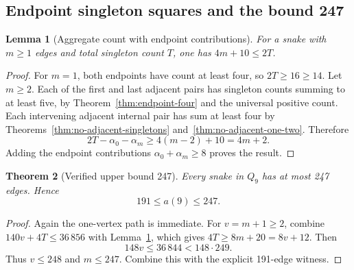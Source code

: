 \documentclass[11pt,a4paper]{article}
\newtheorem{theorem}{Theorem}[section]
\newtheorem{lemma}[theorem]{Lemma}
\theoremstyle{definition}
\theoremstyle{remark}
\newcommand{\Q}{Q}
\begin{document}
\subsection{Endpoint singleton squares and the bound 247}
\begin{lemma}[Aggregate count with endpoint contributions]\label{lem:aggregate-endpoints}
For a snake with $m\ge1$ edges and total singleton count $T$, one has $4m+10\le2T$.
\end{lemma}
\begin{proof}
For $m=1$, both endpoints have count at least four, so $2T\ge16\ge14$. Let $m\ge2$. Each of the first and last adjacent pairs has singleton counts summing to at least five, by Theorem~\ref{thm:endpoint-four} and the universal positive count. Each intervening adjacent internal pair has sum at least four by Theorems~\ref{thm:no-adjacent-singletons} and~\ref{thm:no-adjacent-one-two}. Therefore
\[
2T-\alpha_0-\alpha_m\ge4(m-2)+10=4m+2.
\]
Adding the endpoint contributions $\alpha_0+\alpha_m\ge8$ proves the result.
\end{proof}

\begin{theorem}[Verified upper bound 247]\label{thm:upper247}
Every snake in $\Q_9$ has at most 247 edges. Hence
\[
\boxed{191\le a(9)\le247.}
\]
\end{theorem}
\begin{proof}
Again the one-vertex path is immediate. For $v=m+1\ge2$, combine $140v+4T\le36\,856$ with Lemma~\ref{lem:aggregate-endpoints}, which gives $4T\ge8m+20=8v+12$. Then
\[
148v\le36\,844<148\cdot249.
\]
Thus $v\le248$ and $m\le247$. Combine this with the explicit 191-edge witness.
\end{proof}
\end{document}
